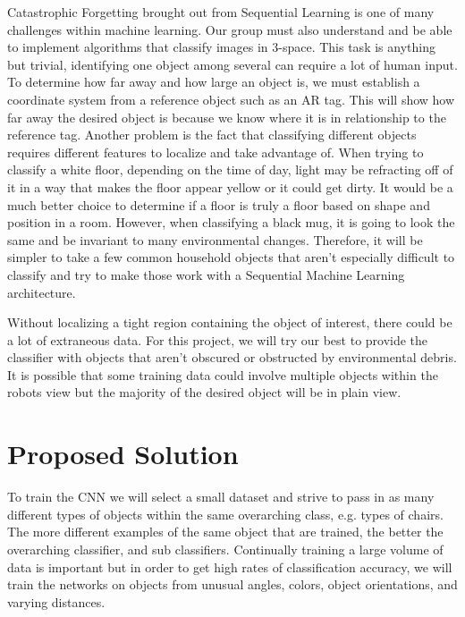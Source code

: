 \documentclass[a4paper]{article}
\begin{document}
Catastrophic Forgetting brought out from Sequential Learning is one of many challenges within machine learning. Our group must also understand and be able to implement algorithms that classify images in 3-space. This task is anything but trivial, identifying one object among several can require a lot of human input. To determine how far away and how large an object is, we must establish a coordinate system from a reference object such as an AR tag. This will show how far away the desired object is because we know where it is in relationship to the reference tag. Another problem is the fact that classifying different objects requires different features to localize and take advantage of. When trying to classify a white floor, depending on the time of day, light may be refracting off of it in a way that makes the floor appear yellow or it could get dirty. It would be a much better choice to determine if a floor is truly a floor based on shape and position in a room. However, when classifying a black mug, it is going to look the same and be invariant to many environmental changes. Therefore, it will be simpler to take a few common household objects that aren't especially difficult to classify and try to make those work with a Sequential Machine Learning architecture.

Without localizing a tight region containing the object of interest, there could be a lot of extraneous data. For this project, we will try our best to provide the classifier with objects that aren't obscured or obstructed by environmental debris. It is possible that some training data could involve multiple objects within the robots view but the majority of the desired object will be in plain view.


\section{Proposed Solution}
To train the CNN we will select a small dataset and strive to pass in as many different types of objects within the same overarching class, e.g. types of chairs. The more different examples of the same object that are trained, the better the overarching classifier, and sub classifiers. Continually training a large volume of data is important but in order to get high rates of classification accuracy, we will train the networks on objects from unusual angles, colors, object orientations, and varying distances.
\end{document}
